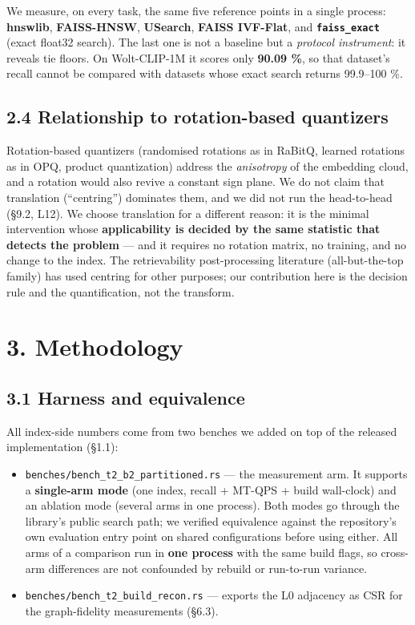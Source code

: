 \documentclass[
  10pt,
]{article}
\providecommand{\tightlist}{%
  \setlength{\itemsep}{0pt}\setlength{\parskip}{0pt}}
\begin{document}
We measure, on every task, the same five reference points in a single
process: \textbf{hnswlib}, \textbf{FAISS-HNSW}, \textbf{USearch},
\textbf{FAISS IVF-Flat}, and \textbf{\texttt{faiss\_exact}} (exact
float32 search). The last one is not a baseline but a \emph{protocol
instrument}: it reveals tie floors. On Wolt-CLIP-1M it scores only
\textbf{90.09 \%}, so that dataset's recall cannot be compared with
datasets whose exact search returns 99.9--100 \%.

\subsection{2.4 Relationship to rotation-based
quantizers}\label{relationship-to-rotation-based-quantizers}

Rotation-based quantizers (randomised rotations as in RaBitQ, learned
rotations as in OPQ, product quantization) address the \emph{anisotropy}
of the embedding cloud, and a rotation would also revive a constant sign
plane. We do not claim that translation (``centring'') dominates them,
and we did not run the head-to-head (§9.2, L12). We choose translation
for a different reason: it is the minimal intervention whose
\textbf{applicability is decided by the same statistic that detects the
problem} --- and it requires no rotation matrix, no training, and no
change to the index. The retrievability post-processing literature
(all-but-the-top family) has used centring for other purposes; our
contribution here is the decision rule and the quantification, not the
transform.

\section{3. Methodology}\label{methodology}

\subsection{3.1 Harness and equivalence}\label{harness-and-equivalence}

All index-side numbers come from two benches we added on top of the
released implementation (§1.1):

\begin{itemize}
\tightlist
\item
  \texttt{benches/bench\_t2\_b2\_partitioned.rs} --- the measurement
  arm. It supports a \textbf{single-arm mode} (one index, recall +
  MT-QPS + build wall-clock) and an ablation mode (several arms in one
  process). Both modes go through the library's public search path; we
  verified equivalence against the repository's own evaluation entry
  point on shared configurations before using either. All arms of a
  comparison run in \textbf{one process} with the same build flags, so
  cross-arm differences are not confounded by rebuild or run-to-run
  variance.
\item
  \texttt{benches/bench\_t2\_build\_recon.rs} --- exports the L0
  adjacency as CSR for the graph-fidelity measurements (§6.3).
\end{itemize}
\end{document}
